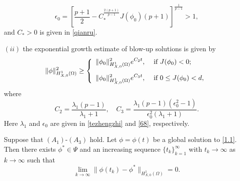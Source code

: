 \documentclass[10pt,a4paper]{amsart}
\newcommand{\ds}{\displaystyle}
\begin{document}
\begin{thm}
\begin{description}
\begin{equation}
  \epsilon_0=\left[\frac{p+1}{2}-C_*^{\frac{2(p+1)}{p-1}}J(\phi_0)(p+1)\right]^{\frac{1}{p-1}}>1,
  \end{equation}
  and $C_*>0$ is given in \eqref{qianru}.
  \item{$(ii)$} the exponential growth estimate of blow-up solutions is given by
  \begin{equation*}
  \|\phi\|_{H_{X,0}^1(\Omega)}^2\geq\left\{
               \begin{array}{ll}
               \ds  \|\phi_0\|_{H_{X,0}^1(\Omega)}^2e^{C_2t},&\hbox{ if }J(\phi_0)<0; \\
               \vspace{-0.05in}\\
               \ds  \|\phi_0\|_{H_{X,0}^1(\Omega)}^2e^{C_3t},&\hbox{ if }0\leq J(\phi_0)<d,
               \end{array}
             \right.
  \end{equation*}
  where
  \begin{equation}\label{C23}
  C_2=\frac{\lambda_1(p-1)}{\lambda_1+1},\quad
  C_3=\frac{\lambda_1(p-1)\left(\epsilon_0^2-1\right)}{\epsilon_0^2(\lambda_1+1)}.
  \end{equation}
  Here $\lambda_1$ and $\epsilon_0$ are given in \eqref{tezhengzhi} and \eqref{68}, respectively.
\end{description}
\end{thm}

\begin{thm}\label{xx-33}
Suppose that $(A_1)$-$(A_3)$ hold. Let $\phi=\phi(t)$ be a global solution to \eqref{1.1}. Then there exists $\phi^*\in \Psi$ and an increasing sequence $\{t_k\}_{k=1}^\infty$ with $t_k\rightarrow\infty$ as $k\rightarrow\infty$ such that
\begin{equation*}
\lim_{k\rightarrow\infty}\|\phi(t_k)-\phi^*\|_{H_{X,0}^1(\Omega)}=0.
\end{equation*}
\end{thm}
\end{document}

